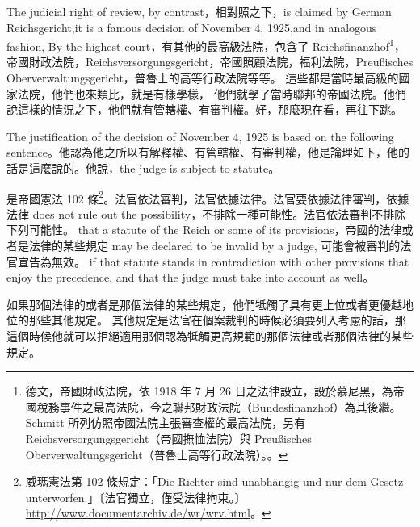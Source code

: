\hypertarget{w05:cue:286}{}The judicial right of review, by contrast，相對照之下，is claimed by German Reichsgericht,it is a famous decision of November 4, 1925,and in analogous fashion,
\hypertarget{w05:cue:287}{}By the highest court，有其他的最高級法院，包含了 Reichsfinanzhof\footnote{德文，帝國財政法院，依 1918 年 7 月 26 日之法律設立，設於慕尼黑，為帝國稅務事件之最高法院，今之聯邦財政法院（Bundesfinanzhof）為其後繼。Schmitt 所列仿照帝國法院主張審查權的最高法院，另有 Reichsversorgungsgericht（帝國撫恤法院）與 Preußisches Oberverwaltungsgericht（普魯士高等行政法院）。\cite[82]{schmitt2015}。}，帝國財政法院，Reichsversorgungsgericht，帝國照顧法院，福利法院，Preußisches Oberverwaltungsgericht，普魯士的高等行政法院等等。
\hypertarget{w05:cue:288}{}這些都是當時最高級的國家法院，他們也來類比，就是有樣學樣，
\hypertarget{w05:cue:289}{}他們就學了當時聯邦的帝國法院。他們說這樣的情況之下，他們就有管轄權、有審判權。好，那麼現在看，再往下跳。

\hypertarget{w05:cue:290}{}The justification of the decision of November 4, 1925 is based on the following sentence。他認為他之所以有解釋權、有管轄權、有審判權，他是論理如下，他的話是這麼說的。他說，the judge is subject to statute。

\hypertarget{w05:cue:291}{}是帝國憲法 102 條\footnote{威瑪憲法第 102 條規定：「Die Richter sind unabhängig und nur dem Gesetz unterworfen.」〔法官獨立，僅受法律拘束。〕\url{http://www.documentarchiv.de/wr/wrv.html}。}。法官依法審判，法官依據法律。法官要依據法律審判，依據法律 does not rule out the possibility，不排除一種可能性。法官依法審判不排除下列可能性。 that a statute of the Reich or some of its provisions，帝國的法律或者是法律的某些規定 may be declared to be invalid by a judge,
\hypertarget{w05:cue:292}{}可能會被審判的法官宣告為無效。 if that statute stands in contradiction with other provisions that enjoy the precedence, and that the judge must take into account as well。

\hypertarget{w05:cue:293}{}如果那個法律的或者是那個法律的某些規定，他們牴觸了具有更上位或者更優越地位的那些其他規定。
\hypertarget{w05:cue:294}{}其他規定是法官在個案裁判的時候必須要列入考慮的話，那這個時候他就可以拒絕適用那個認為牴觸更高規範的那個法律或者那個法律的某些規定。

